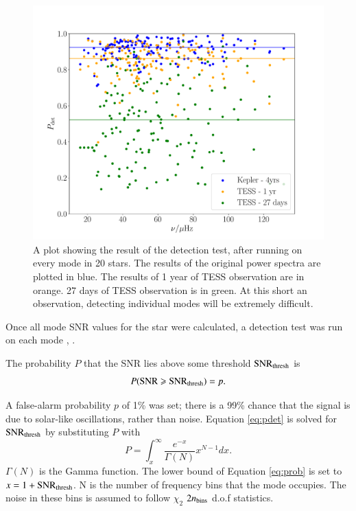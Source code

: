 \documentclass[a4paper,fleqn,usenatbib,useAMS]{mnras}
\begin{document}
\begin{figure}
	\centering
	\includegraphics[scale=0.3]{DetTest_Diagnostic_plot3.pdf}
	\caption{A plot showing the result of the detection test, after running on every mode in 20 stars. The results of the original power spectra are plotted in blue. The results of 1 year of TESS observation are in orange. 27 days of TESS observation is in green. At this short an observation, detecting individual modes will be extremely difficult.}	
	\label{modes}
\end{figure}


Once all mode SNR values for the star were calculated, a detection test was run on each mode \citep{chaplin_predicting_2011}, \citep{campante_asteroseismic_2016}.

The probability $P$ that the SNR lies above some threshold ${\rm SNR_{thresh}}$ is
\begin{equation}
\label{eq:pdet}
{P \rm ({ SNR \geq SNR_{thresh}})} =  p .
\end{equation}

A false-alarm probability $p$ of 1\% was set; there is a 99\% chance that the signal is due to solar-like oscillations, rather than noise. Equation \ref{eq:pdet} is solved for $\rm SNR_{thresh}$ by substituting $P$ with
\begin{equation}
\label{eq:prob}
P = \int_{x}^{\infty} \frac{e^{-x}}{\Gamma(N)} x^{N-1} dx .
\end{equation}
$\Gamma(N)$ is the Gamma function. The lower bound of Equation \ref{eq:prob} is set to $x=1+{\rm SNR_{thresh}}$. N is the number of frequency bins that the mode occupies. The noise in these bins is assumed to follow $\chi_{2}$ $2n_{\rm bins}$ d.o.f statistics. 
\end{document}
